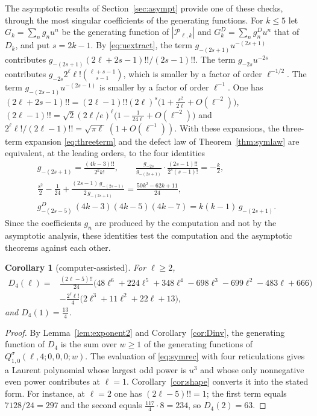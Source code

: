 \documentclass[11pt,a4paper]{article}
\newtheorem{corollary}[theorem]{Corollary}
\theoremstyle{definition}
\newcommand{\cP}{\mathcal{P}}
\begin{document}
The asymptotic results of Section~\ref{sec:asympt} provide one of these checks, through the most singular coefficients of the generating functions. For $k\le5$ let $G_k=\sum_ng_nu^n$ be the generating function of $|\cP_{\ell,k}|$ and $G_k^D=\sum_ng^D_nu^n$ that of $D_k$, and put $s=2k-1$. By \eqref{eq:uextract}, the term $g_{-(2s+1)}u^{-(2s+1)}$ contributes $g_{-(2s+1)}(2\ell+2s-1)!!/(2s-1)!!$. The term $g_{-2s}u^{-2s}$ contributes $g_{-2s}2^\ell\ell!\binom{\ell+s-1}{s-1}$, which is smaller by a factor of order $\ell^{-1/2}$. The term $g_{-(2s-1)}u^{-(2s-1)}$ is smaller by a factor of order $\ell^{-1}$. One has $(2\ell+2s-1)!!=(2\ell-1)!!(2\ell)^s\bigl(1+\frac{s^2}{2\ell}+O(\ell^{-2})\bigr)$, $(2\ell-1)!!=\sqrt2(2\ell/e)^\ell\bigl(1-\frac1{24\ell}+O(\ell^{-2})\bigr)$ and $2^\ell\ell!/(2\ell-1)!!=\sqrt{\pi\ell}\,(1+O(\ell^{-1}))$. With these expansions, the three-term expansion \eqref{eq:threeterm} and the defect law of Theorem~\ref{thm:symlaw} are equivalent, at the leading orders, to the four identities
\begin{equation}\label{eq:gtests}
\begin{gathered}
g_{-(2s+1)}=\frac{(4k-3)!!}{2^kk!},\qquad
\frac{g_{-2s}}{g_{-(2s+1)}}\cdot\frac{(2s-1)!!}{2^s(s-1)!}=-\frac k2,\\
\frac{s^2}2-\frac1{24}+\frac{(2s-1)\,g_{-(2s-1)}}{2\,g_{-(2s+1)}}=\frac{50k^2-62k+11}{24},\\
g^{D}_{-(2s-5)}\,(4k-3)(4k-5)(4k-7)=k(k-1)\,g_{-(2s+1)}.
\end{gathered}
\end{equation}
Since the coefficients $g_n$ are produced by the computation and not by the asymptotic analysis, these identities test the computation and the asymptotic theorems against each other.

\begin{corollary}[computer-assisted]\label{cor:D4}
For $\ell\ge2$,
\begin{align*}
D_4(\ell)={}&\frac{(2\ell-5)!!}{24}\bigl(48\ell^6+224\ell^5+348\ell^4-698\ell^3-699\ell^2-483\ell+666\bigr)\\
&-\frac{2^\ell\ell!}{4}\bigl(2\ell^3+11\ell^2+22\ell+13\bigr),
\end{align*}
and $D_4(1)=\frac{13}{4}$.
\end{corollary}

\begin{proof}
By Lemma~\ref{lem:exponent2} and Corollary~\ref{cor:Dinv}, the generating function of $D_4$ is the sum over $w\ge1$ of the generating functions of $Q^\sigma_{1,0}(\ell,4;0,0,0;w)$. The evaluation of \eqref{eq:symrec} with four reticulations gives a Laurent polynomial whose largest odd power is $u^3$ and whose only nonnegative even power contributes at $\ell=1$. Corollary~\ref{cor:shape} converts it into the stated form. For instance, at $\ell=2$ one has $(2\ell-5)!!=1$; the first term equals $7128/24=297$ and the second equals $\frac{117}{4}\cdot8=234$, so $D_4(2)=63$.
\end{proof}
\end{document}
